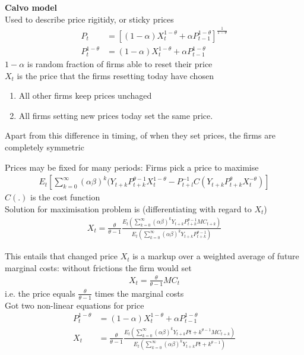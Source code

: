 \documentclass{beamer}
\begin{document}
\begin{frame}
 \textbf{Calvo model}\\
 Used to describe price rigitidy, or sticky prices
\begin{align}
  P_t &= \left[(1-\alpha)X_t^{1-\theta} + \alpha P_{t-1}^{1-\theta} \right] ^{\frac{1}{1-\theta}}\\
  P_t^{1-\theta} &= (1-\alpha)X_t^{1-\theta} + \alpha P_{t-1}^{1-\theta}
\end{align}
$1-\alpha$ is random fraction of firms able to reset their price\\
$X_t$ is the price that the firms resetting today have chosen
\begin{enumerate}
  \item All other firms keep prices unchaged
  \item All firms setting new prices today set the same price.
\end{enumerate}
Apart from this difference in timing, of when they set prices, the firms are completely symmetric
\end{frame}

\begin{frame}
 Prices may be fixed for many periods: Firms pick a price to maximise
\begin{align}
  E_t \left[ \sum_{k=0}^{\infty} (\alpha \beta)^k (Y_{t+k}P_{t+k}^{\theta-1}X_t^{1-\theta} -
  P_{t+l}^{-1}C (Y_{t+k}P_{t+k}^{\theta}X_t^{-\theta}) \right]
\end{align}
$C(.)$ is the cost function\\
Solution for maximisation problem is (differentiating with regard to $X_t$)
\begin{align}
  X_t = \frac{\theta}{\theta-1} \frac{E_t \left(\sum_{k=0}^{\infty}(\alpha \beta)^k Y_{t+k}P_{t+k}^{\theta-1}MC_{t+k} \right)}
  {E_t \left(\sum_{k=0}^{\infty}(\alpha \beta)^k Y_{t+k}P_{t+k}^{\theta-1} \right) }
\end{align}  
\end{frame}

\begin{frame}
  This entails that changed price $X_t$ is a markup over a weighted average of future marginal costs: without frictions the firm would set 
  \begin{align}
    X_t=\frac{\theta}{\theta-1}MC_t
  \end{align}
i.e. the price equals $\frac{\theta}{\theta-1}$ times the marginal costs\\
Got two non-linear equations for price
\begin{align}
    P_t^{1-\theta} &= (1-\alpha)X_t^{1-\theta} + \alpha P_{t-1}^{1-\theta}\\
    X_t &= \frac{\theta}{\theta-1} \frac{E_t \left(\sum_{k=0}^{\infty}(\alpha \beta)^k Y_{t+k}P{t+k}^{\theta-1}MC_{t+k} \right)}
  {E_t \left(\sum_{k=0}^{\infty}(\alpha \beta)^k Y_{t+k}P{t+k}^{\theta-1} \right) }
\end{align}
\end{frame}
\end{document}
